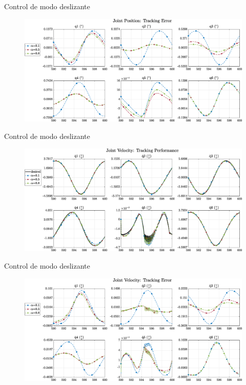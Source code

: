 \documentclass[10pt]{beamer} %
\begin{document}
	\begin{frame}[fragile]{Control de modo deslizante}
		\begin{figure}
			\centering
			\hspace*{-0.7cm}\includegraphics[width=1.1\textwidth]{img/SMCi/circular_traj/600_seg/articular_SMCi_position_error_compare.eps}
		\end{figure}
	\end{frame}	
	
	\begin{frame}[fragile]{Control de modo deslizante}
		\begin{figure}
			\centering
			\hspace*{-0.7cm}\includegraphics[width=1.1\textwidth]{img/SMCi/circular_traj/600_seg/articular_SMCi_velocity_compare.eps}
		\end{figure}
	\end{frame}
	
	\begin{frame}[fragile]{Control de modo deslizante}
		\begin{figure}
			\centering
			\hspace*{-0.7cm}\includegraphics[width=1.1\textwidth]{img/SMCi/circular_traj/600_seg/articular_SMCi_velocity_error_compare.eps}
		\end{figure}
	\end{frame}
	
\end{document}
